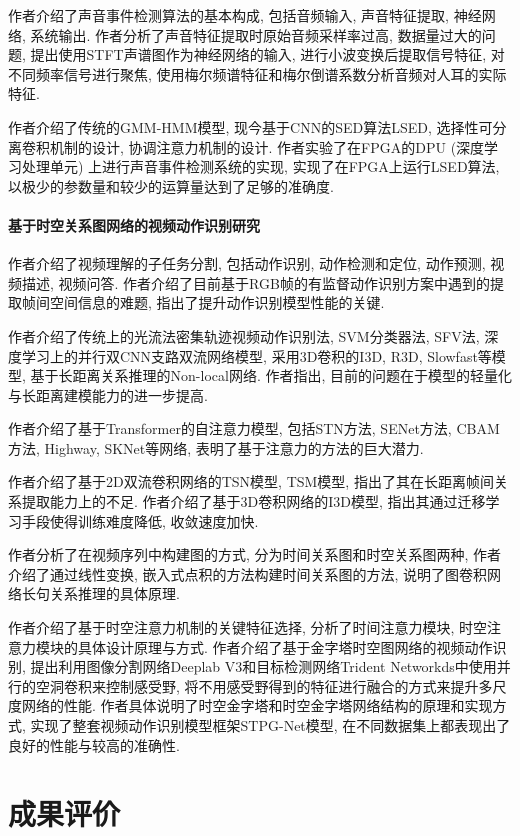 \documentclass[]{ctexart}
\begin{document}
	作者介绍了声音事件检测算法的基本构成, 包括音频输入, 声音特征提取, 神经网络, 系统输出. 作者分析了声音特征提取时原始音频采样率过高, 数据量过大的问题, 提出使用STFT声谱图作为神经网络的输入, 进行小波变换后提取信号特征, 对不同频率信号进行聚焦, 使用梅尔频谱特征和梅尔倒谱系数分析音频对人耳的实际特征. 
	
	作者介绍了传统的GMM-HMM模型, 现今基于CNN的SED算法LSED, 选择性可分离卷积机制的设计, 协调注意力机制的设计. 作者实验了在FPGA的DPU (深度学习处理单元) 上进行声音事件检测系统的实现, 实现了在FPGA上运行LSED算法, 以极少的参数量和较少的运算量达到了足够的准确度. 
	
\paragraph{基于时空关系图网络的视频动作识别研究\cite{videoAction}} 作者介绍了视频理解的子任务分割, 包括动作识别, 动作检测和定位, 动作预测, 视频描述, 视频问答. 作者介绍了目前基于RGB帧的有监督动作识别方案中遇到的提取帧间空间信息的难题, 指出了提升动作识别模型性能的关键. 

	作者介绍了传统上的光流法密集轨迹视频动作识别法, SVM分类器法, SFV法, 深度学习上的并行双CNN支路双流网络模型, 采用3D卷积的I3D, R3D, Slowfast等模型, 基于长距离关系推理的Non-local网络. 作者指出, 目前的问题在于模型的轻量化与长距离建模能力的进一步提高. 
	
	作者介绍了基于Transformer\cite{transformer}的自注意力模型, 包括STN方法, SENet方法, CBAM方法, Highway, SKNet等网络, 表明了基于注意力的方法的巨大潜力. 
	
	作者介绍了基于2D双流卷积网络的TSN模型, TSM模型, 指出了其在长距离帧间关系提取能力上的不足. 作者介绍了基于3D卷积网络的I3D模型, 指出其通过迁移学习手段使得训练难度降低, 收敛速度加快. 
	
	作者分析了在视频序列中构建图的方式, 分为时间关系图和时空关系图两种, 作者介绍了通过线性变换, 嵌入式点积的方法构建时间关系图的方法, 说明了图卷积网络长句关系推理的具体原理. 
	
	作者介绍了基于时空注意力机制的关键特征选择, 分析了时间注意力模块, 时空注意力模块的具体设计原理与方式. 作者介绍了基于金字塔时空图网络的视频动作识别, 提出利用图像分割网络Deeplab V3和目标检测网络Trident Networkds中使用并行的空洞卷积来控制感受野, 将不用感受野得到的特征进行融合的方式来提升多尺度网络的性能. 作者具体说明了时空金字塔和时空金字塔网络结构的原理和实现方式, 实现了整套视频动作识别模型框架STPG-Net模型, 在不同数据集上都表现出了良好的性能与较高的准确性. 
	
\section{成果评价}
\end{document}
